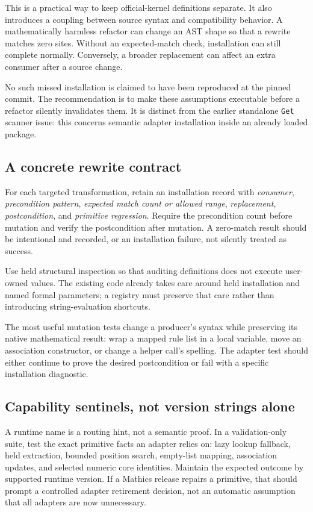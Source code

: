 \documentclass[11pt,letterpaper]{article}
\newcommand{\code}[1]{\nolinkurl{#1}}
\begin{document}
This is a practical way to keep official-kernel definitions separate. It
also introduces a coupling between source syntax and compatibility behavior.
A mathematically harmless refactor can change an AST shape so that a rewrite
matches zero sites. Without an expected-match check, installation can still
complete normally. Conversely, a broader replacement can affect an extra
consumer after a source change.

No such missed installation is claimed to have been reproduced at the pinned
commit. The recommendation is to make these assumptions executable before
a refactor silently invalidates them. It is distinct from the earlier
standalone \code{Get} scanner issue: this concerns semantic adapter
installation inside an already loaded package.

\subsection{A concrete rewrite contract}
For each targeted transformation, retain an installation record with
\emph{consumer}, \emph{precondition pattern}, \emph{expected match count or
allowed range}, \emph{replacement}, \emph{postcondition}, and \emph{primitive
regression}. Require the precondition count before mutation and verify the
postcondition after mutation. A zero-match result should be intentional and
recorded, or an installation failure, not silently treated as success.

Use held structural inspection so that auditing definitions does not execute
user-owned values. The existing code already takes care around held
installation and named formal parameters; a registry must preserve that
care rather than introducing string-evaluation shortcuts.
\cite{repo-mlists,repo-mcalls}

The most useful mutation tests change a producer's syntax while preserving
its native mathematical result: wrap a mapped rule list in a local variable,
move an association constructor, or change a helper call's spelling. The
adapter test should either continue to prove the desired postcondition or
fail with a specific installation diagnostic.

\subsection{Capability sentinels, not version strings alone}
A runtime name is a routing hint, not a semantic proof. In a validation-only
suite, test the exact primitive facts an adapter relies on: lazy lookup
fallback, held extraction, bounded position search, empty-list mapping,
association updates, and selected numeric core identities. Maintain the
expected outcome by supported runtime version. If a Mathics release repairs
a primitive, that should prompt a controlled adapter retirement decision,
not an automatic assumption that all adapters are now unnecessary.
\end{document}
